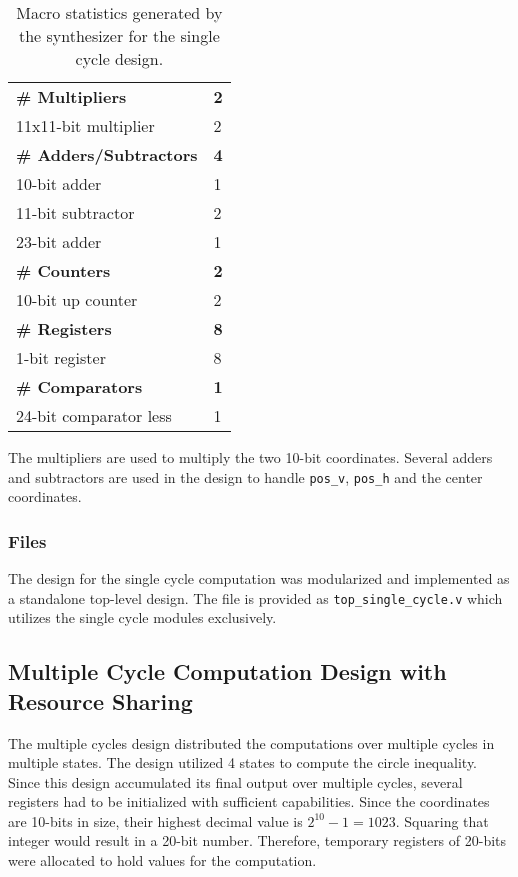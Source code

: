 \documentclass[paper=usletter, fontsize=12pt]{article}
\begin{document}
        \begin{table}[h]
            \caption{Macro statistics generated by the synthesizer for the
            single cycle design.}
            \label{table:singlemacro}
            \centering

            \begin{tabular*}{250pt}{ m{20em}m{1cm} }
                \textbf{\# Multipliers}         & \textbf{2} \\
                 11x11-bit multiplier           & 2 \\
                \textbf{\# Adders/Subtractors}  & \textbf{4} \\
                 10-bit adder                   & 1 \\
                 11-bit subtractor              & 2 \\
                 23-bit adder                   & 1 \\
                \textbf{\# Counters}            & \textbf{2} \\
                 10-bit up counter              & 2 \\
                \textbf{\# Registers}           & \textbf{8} \\
                 1-bit register                 & 8 \\
                \textbf{\# Comparators}         & \textbf{1} \\
                 24-bit comparator less         & 1 \\
            \end{tabular*}

        \end{table}

        The multipliers are used to multiply the two 10-bit coordinates.
        Several adders and subtractors are used in the design to handle
        \texttt{pos\_v}, \texttt{pos\_h} and the center coordinates.

        \subsubsection{Files} The design for the single cycle computation was
        modularized and implemented as a standalone top-level design. The file
        is provided as \texttt{top\_single\_cycle.v} which utilizes the single
        cycle modules exclusively.

        \subsection{Multiple Cycle Computation Design with Resource Sharing}
        The multiple cycles design distributed the computations over multiple
        cycles in multiple states. The design utilized 4 states to compute the
        circle inequality. Since this design accumulated its final output over
        multiple cycles, several registers had to be initialized with
        sufficient capabilities. Since the coordinates are 10-bits in size,
        their highest decimal value is $2^{10}-1=1023$. Squaring that integer
        would result in a 20-bit number. Therefore, temporary registers of
        20-bits were allocated to hold values for the computation.
\end{document}
